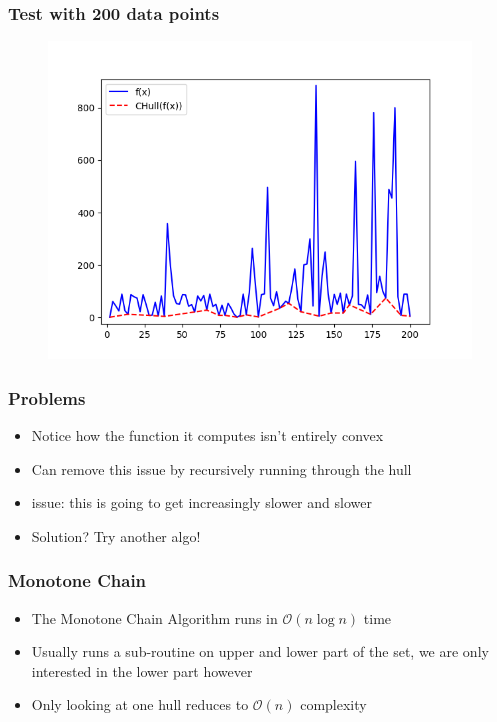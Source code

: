 \documentclass{beamer}
\begin{document}
\begin{frame}
\frametitle{Test with 200 data points}
	\begin{figure}
		\center
		\includegraphics[scale=0.6]{../Figures/Figure_3.png}
	\end{figure}
\end{frame}

\begin{frame}
\frametitle{Problems}
\begin{itemize}
	\item Notice how the function it computes isn't entirely convex
	\pause
	\item Can remove this issue by recursively running through the hull
	\pause
	\item issue: this is going to get increasingly slower and slower
	\pause 
	\item Solution? Try another algo!
\end{itemize}
\end{frame}

\begin{frame}
\frametitle{Monotone Chain}
\begin{itemize}
	\item The Monotone Chain Algorithm runs in $\mathcal{O}(n \log n)$ time
	\pause 
	\item Usually runs a sub-routine on upper and lower part of the set, we are only interested in the lower part however
	\pause
	\item Only looking at one hull reduces to $\mathcal{O}(n)$ complexity
\end{itemize}
\end{frame}
\end{document}
